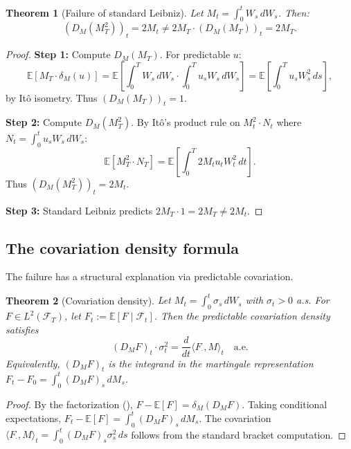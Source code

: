 \documentclass[11pt]{article}
\theoremstyle{plain}
\newtheorem{theorem}{Theorem}[section]
\theoremstyle{definition}
\theoremstyle{remark}
\newcommand{\E}{\mathbb{E}}
\newcommand{\F}{\mathcal{F}}
\begin{document}
\begin{theorem}[Failure of standard Leibniz]\label{thm:leibniz-fails}
Let $M_t = \int_0^t W_s\,dW_s$. Then:
\begin{equation}\label{eq:failure}
(D_M(M_T^2))_t = 2M_t \neq 2M_T \cdot (D_M(M_T))_t = 2M_T.
\end{equation}
\end{theorem}

\begin{proof}
\textbf{Step 1:} Compute $D_M(M_T)$. For predictable $u$:
\[
\E[M_T \cdot \delta_M(u)] = \E\left[\int_0^T W_s\,dW_s \cdot \int_0^T u_s W_s\,dW_s\right]
= \E\left[\int_0^T u_s W_s^2\,ds\right],
\]
by It\^o isometry. Thus $(D_M(M_T))_t = 1$.

\textbf{Step 2:} Compute $D_M(M_T^2)$. By It\^o's product rule on $M_t^2 \cdot N_t$ 
where $N_t = \int_0^t u_s W_s\,dW_s$:
\[
\E[M_T^2 \cdot N_T] = \E\left[\int_0^T 2M_t u_t W_t^2\,dt\right].
\]
Thus $(D_M(M_T^2))_t = 2M_t$.

\textbf{Step 3:} Standard Leibniz predicts $2M_T \cdot 1 = 2M_T \neq 2M_t$.
\end{proof}

\subsection{The covariation density formula}

The failure has a structural explanation via predictable covariation.

\begin{theorem}[Covariation density]\label{thm:cov-density}
Let $M_t = \int_0^t \sigma_s\,dW_s$ with $\sigma_t > 0$ a.s. For $F \in L^2(\F_T)$, 
let $F_t := \E[F \mid \F_t]$. Then the predictable covariation density satisfies
\begin{equation}\label{eq:cov-density}
(D_M F)_t \cdot \sigma_t^2 = \frac{d}{dt}\langle F_\cdot, M \rangle_t \quad \text{a.e.}
\end{equation}
Equivalently, $(D_M F)_t$ is the integrand in the martingale representation 
$F_t - F_0 = \int_0^t (D_M F)_s\,dM_s$.
\end{theorem}

\begin{proof}
By the factorization (), $F - \E[F] = \delta_M(D_M F)$. 
Taking conditional expectations, $F_t - \E[F] = \int_0^t (D_M F)_s\,dM_s$. 
The covariation $\langle F_\cdot, M \rangle_t = \int_0^t (D_M F)_s \sigma_s^2\,ds$ 
follows from the standard bracket computation.
\end{proof}
\end{document}
